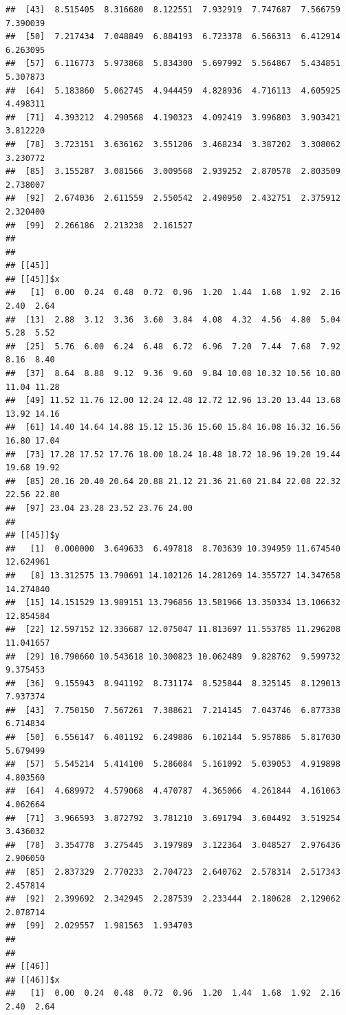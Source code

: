 \documentclass[
  ignorenonframetext,
]{beamer}
\begin{document}
\begin{frame}[fragile]{}
\begin{verbatim}
##  [43]  8.515405  8.316680  8.122551  7.932919  7.747687  7.566759  7.390039
##  [50]  7.217434  7.048849  6.884193  6.723378  6.566313  6.412914  6.263095
##  [57]  6.116773  5.973868  5.834300  5.697992  5.564867  5.434851  5.307873
##  [64]  5.183860  5.062745  4.944459  4.828936  4.716113  4.605925  4.498311
##  [71]  4.393212  4.290568  4.190323  4.092419  3.996803  3.903421  3.812220
##  [78]  3.723151  3.636162  3.551206  3.468234  3.387202  3.308062  3.230772
##  [85]  3.155287  3.081566  3.009568  2.939252  2.870578  2.803509  2.738007
##  [92]  2.674036  2.611559  2.550542  2.490950  2.432751  2.375912  2.320400
##  [99]  2.266186  2.213238  2.161527
## 
## 
## [[45]]
## [[45]]$x
##   [1]  0.00  0.24  0.48  0.72  0.96  1.20  1.44  1.68  1.92  2.16  2.40  2.64
##  [13]  2.88  3.12  3.36  3.60  3.84  4.08  4.32  4.56  4.80  5.04  5.28  5.52
##  [25]  5.76  6.00  6.24  6.48  6.72  6.96  7.20  7.44  7.68  7.92  8.16  8.40
##  [37]  8.64  8.88  9.12  9.36  9.60  9.84 10.08 10.32 10.56 10.80 11.04 11.28
##  [49] 11.52 11.76 12.00 12.24 12.48 12.72 12.96 13.20 13.44 13.68 13.92 14.16
##  [61] 14.40 14.64 14.88 15.12 15.36 15.60 15.84 16.08 16.32 16.56 16.80 17.04
##  [73] 17.28 17.52 17.76 18.00 18.24 18.48 18.72 18.96 19.20 19.44 19.68 19.92
##  [85] 20.16 20.40 20.64 20.88 21.12 21.36 21.60 21.84 22.08 22.32 22.56 22.80
##  [97] 23.04 23.28 23.52 23.76 24.00
## 
## [[45]]$y
##   [1]  0.000000  3.649633  6.497818  8.703639 10.394959 11.674540 12.624961
##   [8] 13.312575 13.790691 14.102126 14.281269 14.355727 14.347658 14.274840
##  [15] 14.151529 13.989151 13.796856 13.581966 13.350334 13.106632 12.854584
##  [22] 12.597152 12.336687 12.075047 11.813697 11.553785 11.296208 11.041657
##  [29] 10.790660 10.543618 10.300823 10.062489  9.828762  9.599732  9.375453
##  [36]  9.155943  8.941192  8.731174  8.525844  8.325145  8.129013  7.937374
##  [43]  7.750150  7.567261  7.388621  7.214145  7.043746  6.877338  6.714834
##  [50]  6.556147  6.401192  6.249886  6.102144  5.957886  5.817030  5.679499
##  [57]  5.545214  5.414100  5.286084  5.161092  5.039053  4.919898  4.803560
##  [64]  4.689972  4.579068  4.470787  4.365066  4.261844  4.161063  4.062664
##  [71]  3.966593  3.872792  3.781210  3.691794  3.604492  3.519254  3.436032
##  [78]  3.354778  3.275445  3.197989  3.122364  3.048527  2.976436  2.906050
##  [85]  2.837329  2.770233  2.704723  2.640762  2.578314  2.517343  2.457814
##  [92]  2.399692  2.342945  2.287539  2.233444  2.180628  2.129062  2.078714
##  [99]  2.029557  1.981563  1.934703
## 
## 
## [[46]]
## [[46]]$x
##   [1]  0.00  0.24  0.48  0.72  0.96  1.20  1.44  1.68  1.92  2.16  2.40  2.64

\end{verbatim}
\end{frame}
\end{document}
